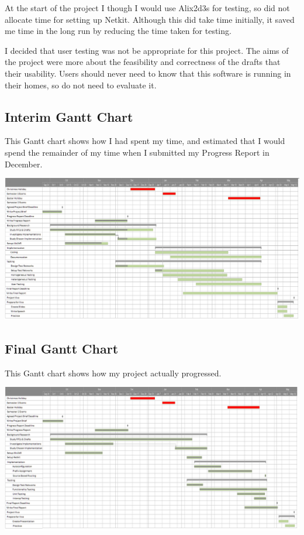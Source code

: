 \documentclass[12pt,a4paper,twoside]{report}
\begin{document}
At the start of the project I though I would use Alix2d3s for testing, so
did not allocate time for setting up Netkit. Although this did take time
initially, it saved me time in the long run by reducing the time taken for
testing. 

I decided that user testing was not be appropriate for this project. The aims
of the project were more about the feasibility and correctness of the drafts
that their usability. Users should never need to know that this software is
running in their homes, so do not need to evaluate it. 

\pagebreak
\begin{landscape} 
\subsection{Interim Gantt Chart}
This Gantt chart shows how I had spent my time, and estimated that I would
spend the remainder of my time when I submitted my Progress Report in December. 

\begin{center}
  \hspace*{-0.75cm}
  \includegraphics[width=1.\linewidth]{../Gantt/EvenBetterDec.png}
\end{center}

\pagebreak

\subsection{Final Gantt Chart}
This Gantt chart shows how my project actually progressed.

\begin{center}
  \hspace*{-0.75cm}
  \includegraphics[width=1.\linewidth]{../Gantt/EvenBetterApril.png}
\end{center}

\end{landscape}
\end{document}
